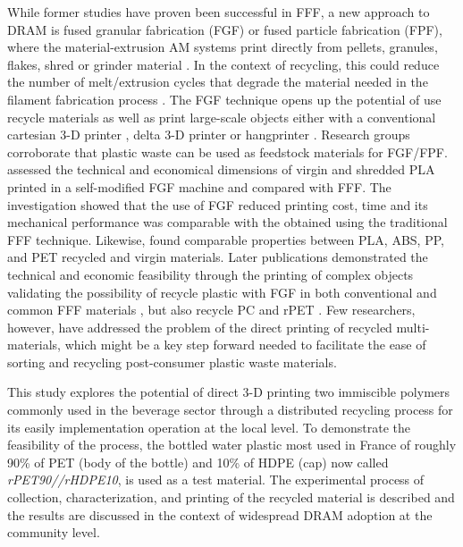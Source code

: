 \documentclass[
  12pt,
  number]{article}
\begin{document}
While former studies have proven been successful in FFF, a new approach
to DRAM is fused granular fabrication (FGF) or fused particle
fabrication (FPF), where the material-extrusion AM systems print
directly from pellets, granules, flakes, shred or grinder material
\citep{fontana2022, woern2018}. In the context of recycling, this could
reduce the number of melt/extrusion cycles that degrade the material
needed in the filament fabrication process \citep{cruzsanchez2017a}. The
FGF technique opens up the potential of use recycle materials as well as
print large-scale objects either with a conventional cartesian 3-D
printer \citep{woern2018}, delta 3-D printer \citep{grassi2019} or
hangprinter \citep[\citep{rattan2023}]{petsiuk2022}. Research groups
corroborate that plastic waste can be used as feedstock materials for
FGF/FPF. \citep{alexandre2020} assessed the technical and economical
dimensions of virgin and shredded PLA printed in a self-modified FGF
machine and compared with FFF. The investigation showed that the use of
FGF reduced printing cost, time and its mechanical performance was
comparable with the obtained using the traditional FFF technique.
Likewise, \citep{woern2018} found comparable properties between PLA,
ABS, PP, and PET recycled and virgin materials. Later publications
demonstrated the technical and economic feasibility through the printing
of complex objects validating the possibility of recycle plastic with
FGF in both conventional and common FFF materials \citep{byard2019}, but
also recycle PC \citep{reich2019b} and rPET \citep{little2020}. Few
researchers, however, have addressed the problem of the direct printing
of recycled multi-materials, which might be a key step forward needed to
facilitate the ease of sorting and recycling post-consumer plastic waste
materials.

This study explores the potential of direct 3-D printing two immiscible
polymers commonly used in the beverage sector through a distributed
recycling process for its easily implementation operation at the local
level. To demonstrate the feasibility of the process, the bottled water
plastic most used in France of roughly 90\% of PET (body of the bottle)
and 10\% of HDPE (cap) now called \emph{rPET90//rHDPE10}, is used as a
test material. The experimental process of collection, characterization,
and printing of the recycled material is described and the results are
discussed in the context of widespread DRAM adoption at the community
level.


\renewcommand\refname{References}
  
\end{document}
